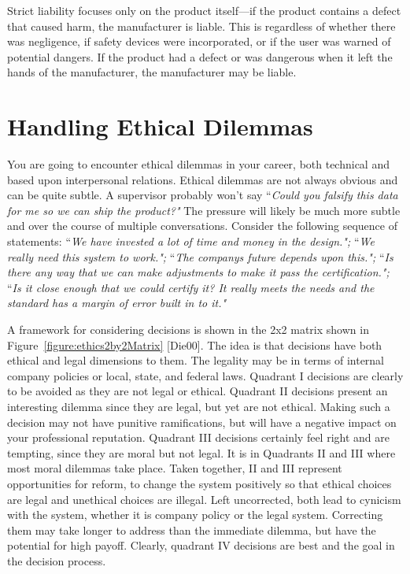 Strict liability focuses only on the product itself---if the product
contains a defect that caused harm, the manufacturer is liable. This is
regardless of whether there was negligence, if safety devices were
incorporated, or if the user was warned of potential dangers. If the
product had a defect or was dangerous when it left the hands of the
manufacturer, the manufacturer may be liable.

\section{Handling Ethical Dilemmas}
\label{section:handling-ethical-dilemmas}

You are going to encounter ethical dilemmas in your career, both
technical and based upon interpersonal relations. Ethical dilemmas are
not always obvious and can be quite subtle. A supervisor probably won't
say ``\emph{Could you falsify this data for me so we can ship the
product?"} The pressure will likely be much more subtle and over the
course of multiple conversations. 
Consider the following sequence of statements: ``\emph{We have
invested a lot of time and money in the design.";} ``\emph{We really
need this system to work.";} ``\emph{The company\textquotesingle s
future depends upon this.";} ``\emph{Is there any way that we can make
adjustments to make it pass the certification.";} ``\emph{Is it close
enough that we could certify it? It really meets the needs and the
standard has a margin of error built in to it."}

A framework for considering decisions is shown in the 2x2 matrix shown
in Figure~\ref{figure:ethics2by2Matrix} {[}Die00{]}. The idea is that decisions have both ethical
and legal dimensions to them. The legality may be in terms of internal
company policies or local, state, and federal laws. Quadrant I decisions
are clearly to be avoided as they are not legal or ethical. Quadrant II
decisions present an interesting dilemma since they are legal, but yet
are not ethical. Making such a decision may not have punitive
ramifications, but will have a negative impact on your professional
reputation. Quadrant III decisions certainly feel right and are
tempting, since they are moral but not legal. It is in Quadrants II and
III where most moral dilemmas take place. Taken together, II and III
represent opportunities for reform, to change the system positively so
that ethical choices are legal and unethical choices are illegal. Left
uncorrected, both lead to cynicism with the system, whether it is
company policy or the legal system. Correcting them may take longer to
address than the immediate dilemma, but have the potential for high
payoff. Clearly, quadrant IV decisions are best and the goal in the
decision process.

